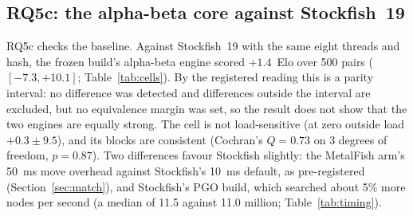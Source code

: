 \documentclass{article}
\newcommand{\MF}{MetalFish}
\begin{document}
\subsection{RQ5c: the alpha-beta core against Stockfish~19}
RQ5c checks the baseline. Against Stockfish~19 with the same eight threads and hash, the frozen build's alpha-beta engine scored $+1.4$~Elo over 500 pairs ($[-7.3, +10.1]$; Table~\ref{tab:cells}). By the registered reading this is a parity interval: no difference was detected and differences outside the interval are excluded, but no equivalence margin was set, so the result does not show that the two engines are equally strong. The cell is not load-sensitive (at zero outside load $+0.3 \pm 9.5$), and its blocks are consistent (Cochran's $Q = 0.73$ on 3 degrees of freedom, $p = 0.87$). Two differences favour Stockfish slightly: the \MF{} arm's 50~ms move overhead against Stockfish's 10~ms default, as pre-registered (Section~\ref{sec:match}), and Stockfish's PGO build, which searched about 5\% more nodes per second (a median of 11.5 against 11.0 million; Table~\ref{tab:timing}).
\end{document}
